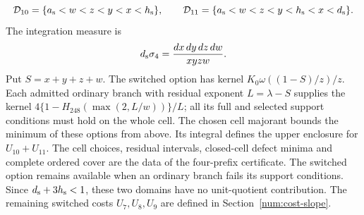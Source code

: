 \[
 \mathcal D_{10}=\{{a_{\rm s}}<w<z<y<x<{h_{\rm s}}\},\qquad
 \mathcal D_{11}=\{{a_{\rm s}}<w<z<y<{h_{\rm s}}<x<{d_{\rm s}}\}.
\]
The integration measure is
\[
 {d_{\rm s}}\sigma_4=\frac{dx\,dy\,dz\,dw}{xyzw}.
\]
Put $S=x+y+z+w$. The switched option has kernel
$K_0\omega((1-S)/z)/z$. Each admitted ordinary branch with residual
exponent $L=\lambda-S$ supplies the kernel
$4\{1-H_{248}(\max(2,L/w))\}/L$; all its full and selected support conditions
must hold on the whole cell. The chosen cell majorant bounds the
minimum of these options from above. Its integral defines the upper
enclosure for $U_{10}+U_{11}$. The cell choices, residual intervals,
closed-cell defect minima and complete ordered cover are the data
of the four-prefix certificate. The switched option remains available
when an ordinary branch fails its support conditions. Since ${d_{\rm s}}+3{h_{\rm s}}<1$, these two
domains have no unit-quotient contribution.
The remaining switched costs $U_7,U_8,U_9$ are defined in
Section~\ref{num:cost-slope}.
